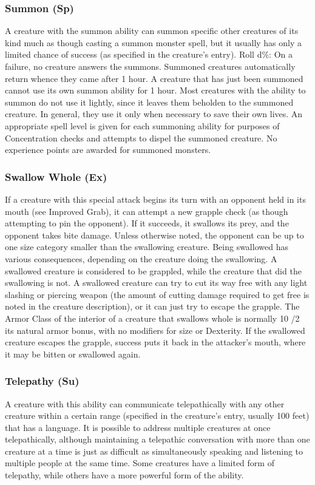 {\subsubsection{Summon (Sp)} A creature with the summon ability can summon specific other creatures of its kind much as though casting a summon monster spell, but it usually has only a limited chance of success (as specified in the creature's entry). Roll d\%: On a failure, no creature answers the summons. Summoned creatures automatically return whence they came after 1 hour. A creature that has just been summoned cannot use its own summon ability for 1 hour. Most creatures with the ability to summon do not use it lightly, since it leaves them beholden to the summoned creature. In general, they use it only when necessary to save their own lives. An appropriate spell level is given for each summoning ability for purposes of Concentration checks and attempts to dispel the summoned creature. No experience points are awarded for summoned monsters.

\subsubsection{Swallow Whole (Ex)} If a creature with this special attack begins its turn with an opponent held in its mouth (see Improved Grab), it can attempt a new grapple check (as though attempting to pin the opponent). If it succeeds, it swallows its prey, and the opponent takes bite damage. Unless otherwise noted, the opponent can be up to one size category smaller than the swallowing creature. Being swallowed has various consequences, depending on the creature doing the swallowing. A swallowed creature is considered to be grappled, while the creature that did the swallowing is not. A swallowed creature can try to cut its way free with any light slashing or piercing weapon (the amount of cutting damage required to get free is noted in the creature description), or it can just try to escape the grapple. The Armor Class of the interior of a creature that swallows whole is normally 10 /2 its natural armor bonus, with no modifiers for size or Dexterity. If the swallowed creature escapes the grapple, success puts it back in the attacker's mouth, where it may be bitten or swallowed again.

\subsubsection{Telepathy (Su)} A creature with this ability can communicate telepathically with any other creature within a certain range (specified in the creature's entry, usually 100 feet) that has a language. It is possible to address multiple creatures at once telepathically, although maintaining a telepathic conversation with more than one creature at a time is just as difficult as simultaneously speaking and listening to multiple people at the same time.
Some creatures have a limited form of telepathy, while others have a more powerful form of the ability.

}
